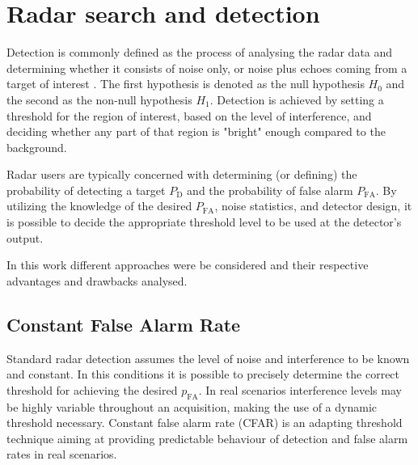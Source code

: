 
	\section{Radar search and detection}
	\label{sec:radar_search_detection}
		Detection is commonly defined as the process of analysing the radar data and determining whether it consists of noise only, or noise plus echoes coming from a target of interest \cite{Richards_Scheer_Holm_2010}. 
		The first hypothesis is denoted as the null hypothesis $H_0$ and the second as the non-null hypothesis $H_1$.
		Detection is achieved by setting a threshold for the region of interest, based on the level of interference, and deciding whether any part of that region is "bright" enough compared to the background.
		
		
		Radar users are typically concerned with determining (or defining) the probability of detecting a target $P_\text{D}$ and the probability of false alarm $P_\text{{FA}}$.  By utilizing the knowledge of the desired $P_\text{{FA}}$, noise statistics, and detector design, it is possible to decide the appropriate threshold level to be used at the detector's output.
		
		
		
		
		
		In this work different approaches were be considered and their respective advantages and drawbacks analysed. 



		\subsection{Constant False Alarm Rate}
	
				Standard radar detection assumes the level of noise and interference to be known and constant. In this conditions it is possible to precisely determine the correct threshold for achieving the desired $	p_\text{FA}$. In real scenarios interference levels may be highly variable throughout an acquisition, making the use of a dynamic threshold necessary. Constant false alarm rate (CFAR) is an adapting threshold technique aiming at providing predictable behaviour of detection and false alarm rates in real scenarios.
				
